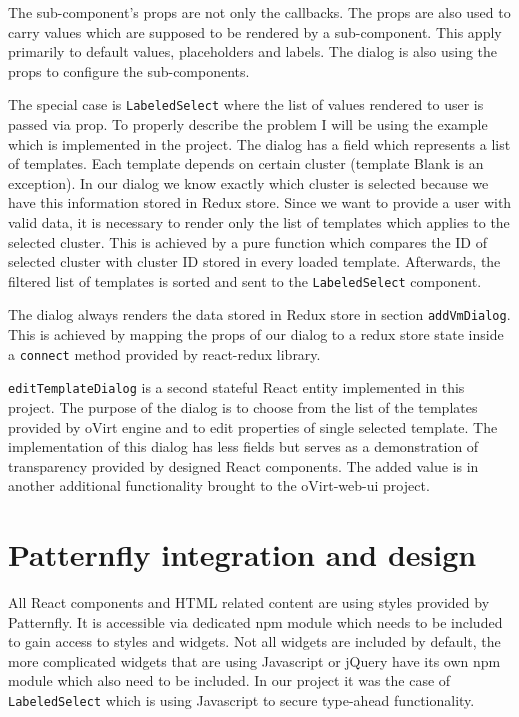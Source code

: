 The sub-component's props are not only the callbacks. The props are also used to carry values which are supposed to be rendered by a sub-component. This apply primarily to default values, placeholders and labels. The dialog is also using the props to configure the sub-components. 

The special case is \texttt{LabeledSelect} where the list of values rendered to user is passed via prop. To properly describe the problem I will be using the example which is implemented in the project. The dialog has a field which represents a list of templates. Each template depends on certain cluster (template Blank is an exception). In our dialog we know exactly which cluster is selected because we have this information stored in Redux store. Since we want to provide a user with valid data, it is necessary to render only the list of templates which applies to the selected cluster. This is achieved by a pure function which compares the ID of selected cluster with cluster ID stored in every loaded template. Afterwards, the filtered list of templates is sorted and sent to the \texttt{LabeledSelect} component.

The dialog always renders the data stored in Redux store in section \texttt{addVmDialog}. This is achieved by mapping the props of our dialog to a redux store state inside a \texttt{connect} method provided by react-redux library. 

\texttt{editTemplateDialog} is a second stateful React entity implemented in this project. The purpose of the dialog is to choose from the list of the templates provided by oVirt engine and to edit properties of single selected template. The implementation of this dialog has less fields but serves as a demonstration of transparency provided by designed React components. The added value is in another additional functionality brought to the oVirt-web-ui project. 

\section{Patternfly integration and design}
All React components and HTML related content are using styles provided by Patternfly. It is accessible via dedicated npm module which needs to be included to gain access to styles and widgets. Not all widgets are included by default, the more complicated widgets that are using Javascript or jQuery have its own npm module which also need to be included. In our project it was the case of \texttt{LabeledSelect} which is using Javascript to secure type-ahead functionality.

